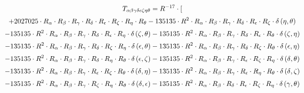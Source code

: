 \begin{subequations}\begin{gather}
T_{\alpha{}\beta{}\gamma{}\delta{}\epsilon{}\zeta{}\eta{}\theta{}} = R^{-17} \cdot [ 
 \\[0.2em] \notag + 2027025 \cdot R_{\alpha{}} \cdot R_{\beta{}} \cdot R_{\gamma{}} \cdot R_{\delta{}} \cdot R_{\epsilon{}} \cdot R_{\zeta{}} \cdot R_{\eta{}} \cdot R_{\theta{}}- 135135 \cdot R^{2} \cdot R_{\alpha{}} \cdot R_{\beta{}} \cdot R_{\gamma{}} \cdot R_{\delta{}} \cdot R_{\epsilon{}} \cdot R_{\zeta{}} \cdot \delta{}\left(\eta{}, \theta{}\right) 
 \\[0.2em] \notag 		 - 135135 \cdot R^{2} \cdot R_{\alpha{}} \cdot R_{\beta{}} \cdot R_{\gamma{}} \cdot R_{\delta{}} \cdot R_{\epsilon{}} \cdot R_{\eta{}} \cdot \delta{}\left(\zeta{}, \theta{}\right)- 135135 \cdot R^{2} \cdot R_{\alpha{}} \cdot R_{\beta{}} \cdot R_{\gamma{}} \cdot R_{\delta{}} \cdot R_{\epsilon{}} \cdot R_{\theta{}} \cdot \delta{}\left(\zeta{}, \eta{}\right) 
 \\[0.2em] \notag 		 - 135135 \cdot R^{2} \cdot R_{\alpha{}} \cdot R_{\beta{}} \cdot R_{\gamma{}} \cdot R_{\delta{}} \cdot R_{\zeta{}} \cdot R_{\eta{}} \cdot \delta{}\left(\epsilon{}, \theta{}\right)- 135135 \cdot R^{2} \cdot R_{\alpha{}} \cdot R_{\beta{}} \cdot R_{\gamma{}} \cdot R_{\delta{}} \cdot R_{\zeta{}} \cdot R_{\theta{}} \cdot \delta{}\left(\epsilon{}, \eta{}\right) 
 \\[0.2em] \notag 		 - 135135 \cdot R^{2} \cdot R_{\alpha{}} \cdot R_{\beta{}} \cdot R_{\gamma{}} \cdot R_{\delta{}} \cdot R_{\eta{}} \cdot R_{\theta{}} \cdot \delta{}\left(\epsilon{}, \zeta{}\right)- 135135 \cdot R^{2} \cdot R_{\alpha{}} \cdot R_{\beta{}} \cdot R_{\gamma{}} \cdot R_{\epsilon{}} \cdot R_{\zeta{}} \cdot R_{\eta{}} \cdot \delta{}\left(\delta{}, \theta{}\right) 
 \\[0.2em] \notag 		 - 135135 \cdot R^{2} \cdot R_{\alpha{}} \cdot R_{\beta{}} \cdot R_{\gamma{}} \cdot R_{\epsilon{}} \cdot R_{\zeta{}} \cdot R_{\theta{}} \cdot \delta{}\left(\delta{}, \eta{}\right)- 135135 \cdot R^{2} \cdot R_{\alpha{}} \cdot R_{\beta{}} \cdot R_{\gamma{}} \cdot R_{\epsilon{}} \cdot R_{\eta{}} \cdot R_{\theta{}} \cdot \delta{}\left(\delta{}, \zeta{}\right) 
 \\[0.2em] \notag 		 - 135135 \cdot R^{2} \cdot R_{\alpha{}} \cdot R_{\beta{}} \cdot R_{\gamma{}} \cdot R_{\zeta{}} \cdot R_{\eta{}} \cdot R_{\theta{}} \cdot \delta{}\left(\delta{}, \epsilon{}\right)- 135135 \cdot R^{2} \cdot R_{\alpha{}} \cdot R_{\beta{}} \cdot R_{\delta{}} \cdot R_{\epsilon{}} \cdot R_{\zeta{}} \cdot R_{\eta{}} \cdot \delta{}\left(\gamma{}, \theta{}\right) 

\end{gather}
\end{subequations}
